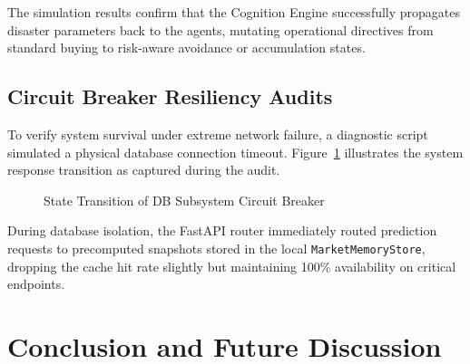 \documentclass[12pt,a4paper]{report}
\begin{document}
The simulation results confirm that the Cognition Engine successfully propagates disaster parameters back to the agents, mutating operational directives from standard buying to risk-aware avoidance or accumulation states.

\section{Circuit Breaker Resiliency Audits}

To verify system survival under extreme network failure, a diagnostic script simulated a physical database connection timeout. Figure~\ref{fig:circuit_breaker_flow} illustrates the system response transition as captured during the audit.

\begin{figure}[H]
\centering
{}
\caption{State Transition of DB Subsystem Circuit Breaker}
\label{fig:circuit_breaker_flow}
\end{figure}

During database isolation, the FastAPI router immediately routed prediction requests to precomputed snapshots stored in the local \texttt{MarketMemoryStore}, dropping the cache hit rate slightly but maintaining 100\% availability on critical endpoints.

\chapter{Conclusion and Future Discussion}
\end{document}
